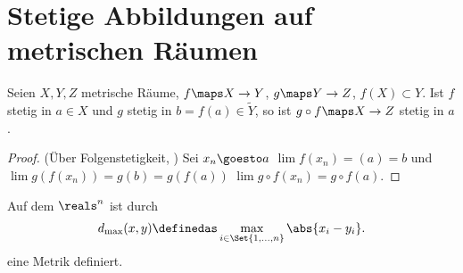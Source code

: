 \section*{Stetige Abbildungen auf metrischen Räumen}
\begin{lemma}\label{metrische_raeume_komposition_stetig}
    Seien \( X,Y,Z\) metrische Räume, \( f\maps X\to Y\), \( g\maps Y\to Z\), \( f(X)\subset Y\). Ist \( f\) stetig in \( a\in X\) und \( g\) stetig in \( b=f(a)\in \tilde{Y} \), so ist \( g\circ f\maps X\to Z\) stetig in \( a\).
\end{lemma}
\begin{proof} (Über Folgenstetigkeit, )
    Sei \( x_n\goesto a\) \timplies \( \lim f(x_n)=(a)=b\) und \( \lim g(f(x_n))=g(b)=g(f(a))\) \timplies \( \lim g\circ f(x_n)=g\circ f(a)\).   
    
\end{proof}
\begin{definition}
    Auf dem \( \reals^n\) ist durch
    \begin{align*}
        d_{\max}(x,y)\definedas \max_{i\in \Set{1,\ldots,n}}\abs{x_i-y_i}. 
    \end{align*}
    eine Metrik definiert.
\end{definition}
